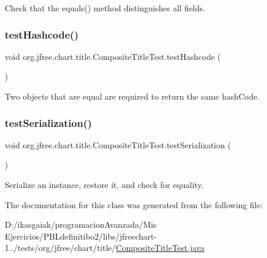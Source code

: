 Check that the equals() method distinguishes all fields. \mbox{\label{classorg_1_1jfree_1_1chart_1_1title_1_1_composite_title_test_a1e99c09742886dfbe1716fe41564826d}} 
\subsubsection{\texorpdfstring{test\+Hashcode()}{testHashcode()}}
{\footnotesize\ttfamily void org.\+jfree.\+chart.\+title.\+Composite\+Title\+Test.\+test\+Hashcode (\begin{DoxyParamCaption}{ }\end{DoxyParamCaption})}

Two objects that are equal are required to return the same hash\+Code. \mbox{\label{classorg_1_1jfree_1_1chart_1_1title_1_1_composite_title_test_a022388ca660a9d0b7cfb82b766a6a306}} 
\subsubsection{\texorpdfstring{test\+Serialization()}{testSerialization()}}
{\footnotesize\ttfamily void org.\+jfree.\+chart.\+title.\+Composite\+Title\+Test.\+test\+Serialization (\begin{DoxyParamCaption}{ }\end{DoxyParamCaption})}

Serialize an instance, restore it, and check for equality. 

The documentation for this class was generated from the following file\+:\begin{DoxyCompactItemize}
\item 
D\+:/ikasgaiak/programacion\+Avanzada/\+Mis Ejercicios/\+P\+B\+Ldefinitibo2/libs/jfreechart-\/1../tests/org/jfree/chart/title/\mbox{\hyperlink{_composite_title_test_8java}{Composite\+Title\+Test.\+java}}\end{DoxyCompactItemize}

